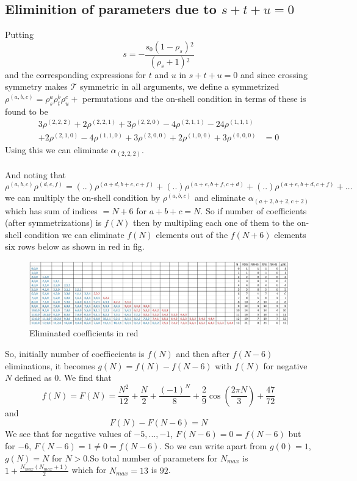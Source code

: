 ﻿\documentclass[12pt,a4paper]{article}
\begin{document}
\subsection{Eliminition of parameters due to $s+t+u=0$}
Putting 
$$
s=-\frac{s_{0} \left(1-\rho _s\right){}^2}{\left(\rho _s+1\right){}^2}
$$
and the corresponding expressions for $t$ and $u$ in $s+t+u=0$ and since crossing symmetry makes $\mathcal{T}$ symmetric in all arguments, we define a symmetrized $\rho^{(a, b,c)}=\rho_{s}^{a} \rho_{t}^{b} \rho_{u}^{c}+$ permutations and the on-shell condition in terms of these is found to be
$$
\begin{aligned}
3\rho^{(2,2,2)}+2\rho^{(2,2,1)}+3\rho^{(2,2,0)}-4\rho^{(2,1,1)}-24\rho^{(1,1,1)}&\\
+2\rho^{(2,1,0)}-4\rho^{(1,1,0)}+3\rho^{(2,0,0)}+2\rho^{(1,0,0)}+3\rho^{(0,0,0)}&=0
\end{aligned}
$$
Using this we can eliminate $\alpha_{(2,2,2)}$.\\\\
And noting that
$$
\rho^{(a,b,c)}\rho^{(d,e,f)}=(..)\rho^{(a+d,b+e,c+f)}+(..)\rho^{(a+e,b+f,c+d)}+(..)\rho^{(a+e,b+d,c+f)}+\ldots
$$
we can multiply the on-shell condition by $\rho^{(a,b,c)}$ and eliminate $\alpha_{(a+2,b+2,c+2)}$ which has sum of indices $= N+6$ for $a+b+c=N$. So if number of coefficients (after symmetrizations) is $f(N)$ then by multipling each one of them to the on-shell condition we can eliminate $f(N)$ elements out of the $f(N+6)$ elements six rows below as shown in red in fig.
\begin{figure}[H]
  \includegraphics[width=\linewidth]{14.jpg}
  \caption{Eliminated coefficients in red}
  \label{fig:1}
\end{figure}
So, initially number of coeffiecients is $f(N)$ and then after $f(N-6)$ eliminations, it becomes $g(N)=f(N)-f(N-6)$ with $f(N)$ for negative $N$ defined as $0$. We find that
$$
f(N)=F(N)=\frac{N^{2}}{12}+\frac{N}{2}+\frac{(-1)^{N}}{8}+\frac{2}{9} \cos \left(\frac{2 \pi N}{3}\right)+\frac{47}{72}
$$
and 
$$
F(N)-F(N-6)=N
$$
We see that for negative values of $-5,...,-1$, $F(N-6)=0=f(N-6)$ but for $-6$, $F(N-6)=1\neq 0=f(N-6)$. So we can write apart from $g(0)=1$, $g(N)=N$ for $N>0$.So total number of parameters for $N_{max}$ is $1+\frac{N_{max}(N_{max}+1)}{2}$ which for $N_{max}=13$ is $92$.
\end{document}
